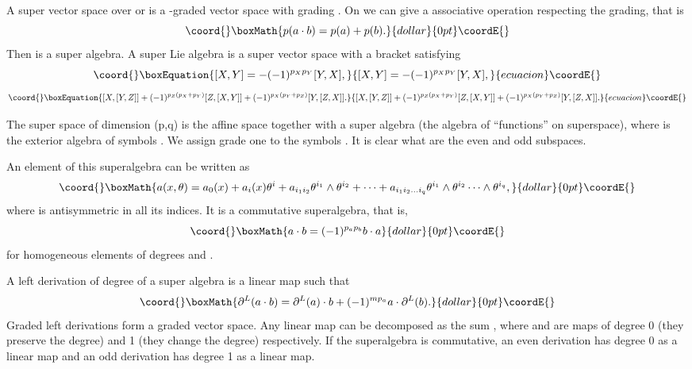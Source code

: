 \documentclass[a4paper,12pt]{article}
\begin{document}
A super vector space over \myHighlight{$\R$}\coordHE{} or  \myHighlight{$\C$}\coordHE{} is a \coordHE{}-graded vector space 
\coordHE{} with 
grading \coordHE{}. On \coordHE{} we can give a associative operation \coordHE{}  respecting the grading, that is
$$\coord{}\boxMath{
p(a\cdot b)=p(a)+p(b).
}{dollar}{0pt}\coordE{}$$
Then \coordHE{} is a super algebra. A super Lie algebra is a super vector space
\coordHE{}
 with a bracket \coordHE{} satisfying
\begin{equation}\coord{}\boxEquation{
[X,Y]=-(-1)^{p_Xp_Y}[Y,X],\label{sp}
}{
[X,Y]=-(-1)^{p_Xp_Y}[Y,X],}{ecuacion}\coordE{}\end{equation}
\begin{equation}\coord{}\boxEquation{
[X,[Y,Z]]+(-1)^{p_Z(p_X+p_Y)}[Z,[X,Y]]+(-1)^{p_X(p_Y+p_Z)}[Y,[Z,X]].
\label{ji}
}{
[X,[Y,Z]]+(-1)^{p_Z(p_X+p_Y)}[Z,[X,Y]]+(-1)^{p_X(p_Y+p_Z)}[Y,[Z,X]].
}{ecuacion}\coordE{}\end{equation}

The super space of dimension (p,q) is the affine space \coordHE{} together
with a
 super algebra \coordHE{} (the
algebra
of ``functions'' on superspace), where
\coordHE{} is  the exterior algebra of
\coordHE{}
 symbols \coordHE{}. We assign grade one to the
 symbols \coordHE{}. It is clear what are the even and odd subspaces.

 An element of this superalgebra can be written as
$$\coord{}\boxMath{
a(x,\theta)=a_0(x)+a_i(x)\theta^i+a_{i_1i_2}\theta^{i_1}\wedge
\theta^{i_2} +\cdots + a_{i_1i_2\dots i_q}\theta^{i_1}\wedge
\theta^{i_2}\cdots \wedge\theta^{i_q},
}{dollar}{0pt}\coordE{}$$
where \coordHE{} is antisymmetric in all its indices.
It is a commutative superalgebra, that is,
$$\coord{}\boxMath{
a\cdot b=(-1)^{p_ap_b}b\cdot a
}{dollar}{0pt}\coordE{}$$
for homogeneous elements of degrees \coordHE{} and \coordHE{}. 


A left derivation of degree \coordHE{} of  a super algebra is  a linear map 
\coordHE{} 
such that 
$$\coord{}\boxMath{
\partial^L(a\cdot b)=\partial^L(a)\cdot b +(-1)^{mp_a}a\cdot\partial^L(b).
}{dollar}{0pt}\coordE{}$$
Graded left derivations form a \coordHE{} graded vector space.
 Any linear map \coordHE{}  can be decomposed as the sum \coordHE{},
where \coordHE{} and \coordHE{} are maps of degree 0 (they preserve the degree) and
1
 (they change the degree) respectively. If the superalgebra is
commutative,
 an even derivation has degree 0 as a linear map and an odd derivation 
has degree 1 as a linear map.
\end{document}
